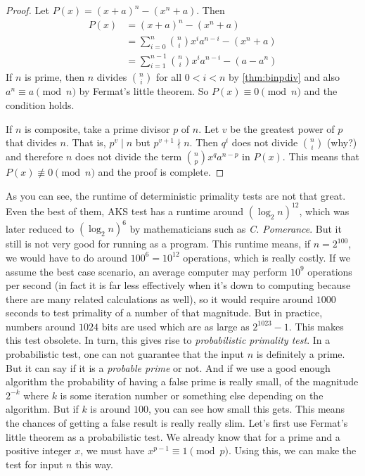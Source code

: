 \documentclass{subfiles}
\begin{document}
		\begin{proof}
			Let $P(x) = (x+a)^n - \left(x^n + a\right)$. Then
				\begin{align*}
					P(x) &= (x+a)^n - \left(x^n + a\right)\\
						 &= \sum_{i=0}^{n} \binom{n}{i} x^i a^{n-i} - \left(x^n + a\right)\\
						 &= \sum_{i=1}^{n-1} \binom{n}{i} x^i a^{n-i} - \left(a - a^n\right)
				\end{align*}
			If $n$ is prime, then $n$ divides $\binom{n}{i}$ for all $0<i<n$ by \autoref{thm:binpdiv} and also $a^n \equiv a \pmod n$ by Fermat's little theorem. So $P(x) \equiv 0 \pmod n$ and the condition holds.

			If $n$ is composite, take a prime divisor $p$ of $n$. Let $v$ be the greatest power of $p$ that divides $n$. That is, $p^v \mid n$ but $p^{v+1} \nmid n$. Then $q^i$ does not divide $\binom{n}{i}$ (why?) and therefore $n$ does not divide the term $\binom{n}{p}x^qa^{n-p}$ in $P(x)$. This means that $P(x) \not \equiv 0 \pmod n$ and the proof is complete.
		\end{proof}
	As you can see, the runtime of deterministic primality tests are not that great. Even the best of them, AKS test has a runtime around $(\log_2n)^{12}$, which was later reduced to $(\log_2n)^6$ by mathematicians such as \textit{C. Pomerance}. But it still is not very good for running as a program. This runtime means, if $n=2^{100}$, we would have to do around $100^6=10^{12}$ operations, which is really costly. If we assume the best case scenario, an average computer may perform $10^9$ operations per second (in fact it is far less effectively when it's down to computing because there are many related calculations as well), so it would require around $1000$ seconds to test primality of a number of that magnitude. But in practice, numbers around $1024$ bits are used which are as large as $2^{1023}-1$. This makes this test obsolete. In turn, this gives rise to \textit{probabilistic primality test}. In a probabilistic test, one can not guarantee that the input $n$ is definitely a prime. But it can say if it is a \textit{probable prime} or not. And if we use a good enough algorithm the probability of having a false prime is really small, of the magnitude $2^{-k}$ where $k$ is some iteration number or something else depending on the algorithm. But if $k$ is around $100$, you can see how small this gets. This means the chances of getting a false result is really really slim. Let's first use Fermat's little theorem as a probabilistic test. We already know that for a prime and a positive integer $x$, we must have $x^{p-1}\equiv1\pmod p$. Using this, we can make the test for input $n$ this way.
\end{document}
